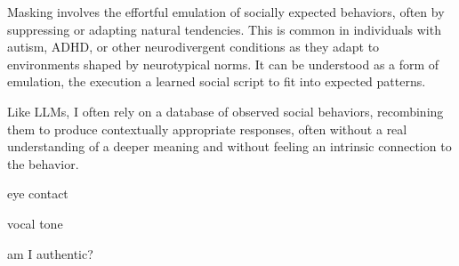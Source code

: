 Masking involves the effortful emulation of socially expected behaviors, often by suppressing or adapting natural tendencies. This is common in individuals with autism, ADHD, or other neurodivergent conditions as they adapt to environments shaped by neurotypical norms. It can be understood as a form of emulation, the execution a learned social script to fit into expected patterns.

Like LLMs, I often rely on a database of observed social behaviors, recombining them to produce contextually appropriate responses, often without a real understanding of a deeper meaning and without feeling an intrinsic connection to the behavior.

eye contact 

vocal tone

am I authentic?

